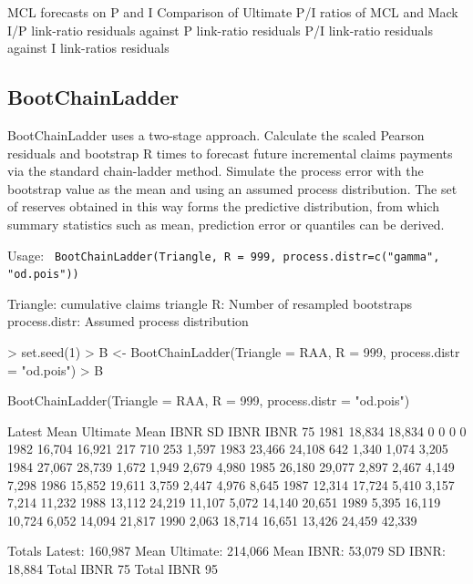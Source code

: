 \documentclass[a4paper]{article}
\begin{document}
MCL forecasts on P and I
Comparison of Ultimate P/I ratios of MCL and Mack
I/P link-ratio residuals against P link-ratio residuals
P/I link-ratio residuals against I link-ratios residuals

\subsection{BootChainLadder}

BootChainLadder uses a two-stage approach.
Calculate the scaled Pearson residuals and bootstrap R times to forecast future incremental claims payments via the standard chain-ladder method.
Simulate the process error with the bootstrap value as the mean and using an assumed process distribution.
The set of reserves obtained in this way forms the predictive distribution, from which summary statistics such as mean, prediction error or quantiles can be derived.

Usage: \texttt{
BootChainLadder(Triangle, R = 999,
    process.distr=c("gamma",
                    "od.pois"))
}

Triangle: cumulative claims triangle
R: Number of resampled bootstraps
process.distr: Assumed process distribution


\begin{Schunk}
\begin{Sinput}
> set.seed(1)
> B <- BootChainLadder(Triangle = RAA, R = 999, process.distr = "od.pois")
> B
\end{Sinput}
\begin{Soutput}
BootChainLadder(Triangle = RAA, R = 999, process.distr = "od.pois")

     Latest Mean Ultimate Mean IBNR SD IBNR IBNR 75%
1981 18,834        18,834         0       0        0        0
1982 16,704        16,921       217     710      253    1,597
1983 23,466        24,108       642   1,340    1,074    3,205
1984 27,067        28,739     1,672   1,949    2,679    4,980
1985 26,180        29,077     2,897   2,467    4,149    7,298
1986 15,852        19,611     3,759   2,447    4,976    8,645
1987 12,314        17,724     5,410   3,157    7,214   11,232
1988 13,112        24,219    11,107   5,072   14,140   20,651
1989  5,395        16,119    10,724   6,052   14,094   21,817
1990  2,063        18,714    16,651  13,426   24,459   42,339

                 Totals
Latest:         160,987
Mean Ultimate:  214,066
Mean IBNR:       53,079
SD IBNR:         18,884
Total IBNR 75%
Total IBNR 95%
\end{Soutput}
\end{Schunk}
\end{document}

